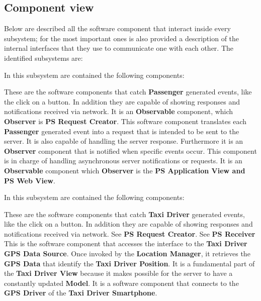 \subsection{Component view}
Below are described all the software component that interact inside every subsystem; for the most important ones is also provided a description of the internal interfaces that they use to communicate one with each other.
The identified subsystems are:
\begin{itemize}
	In this subsystem are contained the following components:
	\begin{itemize}
		 These are the software components that catch \textbf{Passenger} generated events, like the click on a button. In addition they are capable of showing responses and notifications received via network.
		It is an \textbf{Observable} component, which \textbf{Observer} is \textbf{PS Request Creator}.
		 This software component translates each \textbf{Passenger} generated event into a request that is intended to be sent to the server.
		It is also capable of handling the server response.
		Furthermore it is an \textbf{Observer} component that is notified when specific events occur.
		 This component is in charge of handling asynchronous server notifications or requests.
		It is an \textbf{Observable} component which \textbf{Observer} is the \textbf{PS Application View and PS Web View}.
	\end{itemize}
	\itemBold{Taxi Driver View}
	In this subsystem are contained the following components:
	\begin{itemize}
		 These are the software components that catch \textbf{Taxi Driver} generated events, like the click on a button. In addition they are capable of showing responses and notifications received via network.
		 See \textbf{PS Request Creator}.
		 See \textbf{PS Receiver}
		 This is the software component that accesses the interface to the \textbf{Taxi Driver GPS Data Source}. Once invoked by the \textbf{Location Manager}, it retrieves the \textbf{GPS Data} that identify the \textbf{Taxi Driver Position}. It is a fundamental part of the \textbf{Taxi Driver View} because it makes possible for the server to have a constantly updated \textbf{Model}.
		 It is a software component that connects to the \textbf{GPS Driver} of the \textbf{Taxi Driver Smartphone}.

\end{itemize}
\end{itemize}
